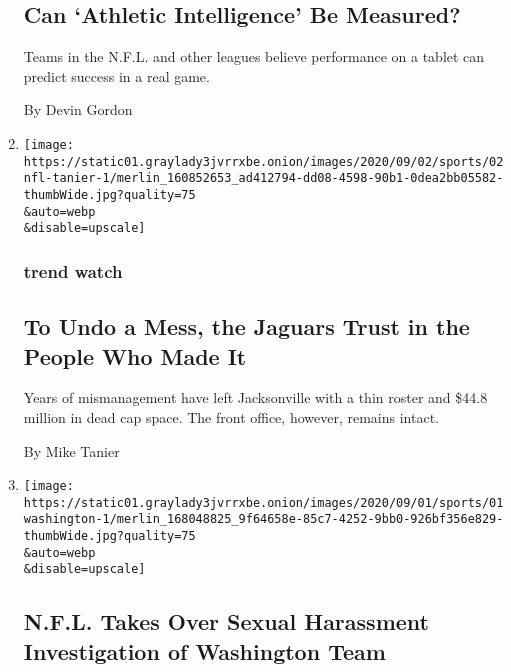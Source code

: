 \begin{enumerate}
  \hypertarget{can-athletic-intelligence-be-measured}{%
  \subsection{Can `Athletic Intelligence' Be
  Measured?}\label{can-athletic-intelligence-be-measured}}

  Teams in the N.F.L. and other leagues believe performance on a tablet
  can predict success in a real game.

  By Devin Gordon
\item
  \href{/2020/09/02/sports/football/jacksonville-jaguars-salary-cap-fournette.html}{}

  \texttt{[image: https://static01.graylady3jvrrxbe.onion/images/2020/09/02/sports/02nfl-tanier-1/merlin\_160852653\_ad412794-dd08-4598-90b1-0dea2bb05582-thumbWide.jpg?quality=75\\\&auto=webp\\\&disable=upscale]}

  \hypertarget{trend-watch}{%
  \subsubsection{trend watch}\label{trend-watch}}

  \hypertarget{to-undo-a-mess-the-jaguars-trust-in-the-people-who-made-it}{%
  \subsection{To Undo a Mess, the Jaguars Trust in the People Who Made
  It}\label{to-undo-a-mess-the-jaguars-trust-in-the-people-who-made-it}}

  Years of mismanagement have left Jacksonville with a thin roster and
  \$44.8 million in dead cap space. The front office, however, remains
  intact.

  By Mike Tanier
\item
  \href{/2020/09/01/sports/football/nfl-washington-sexual-harassment-snyder.html}{}

  \texttt{[image: https://static01.graylady3jvrrxbe.onion/images/2020/09/01/sports/01washington-1/merlin\_168048825\_9f64658e-85c7-4252-9bb0-926bf356e829-thumbWide.jpg?quality=75\\\&auto=webp\\\&disable=upscale]}

  \hypertarget{nfl-takes-over-sexual-harassment-investigation-of-washington-team}{%
  \subsection{N.F.L. Takes Over Sexual Harassment Investigation of
  Washington
  Team}\label{nfl-takes-over-sexual-harassment-investigation-of-washington-team}}


\end{enumerate}
